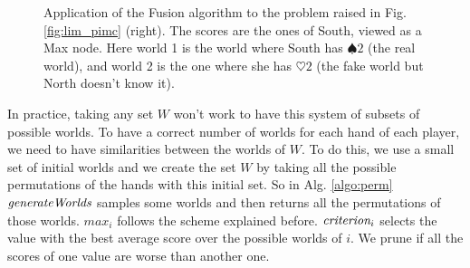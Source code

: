 \documentclass[runningheads]{llncs}
\begin{document}
\begin{figure}[t]
        \caption{Application of the Fusion algorithm to the problem raised in Fig. \ref{fig:lim_pimc} (right). The scores are the ones of South, viewed as a Max node. Here world 1 is the world where South has $\spadesuit 2$ (the real world), and world 2 is the one where she has $\heartsuit 2$ (the fake world but North doesn't know it).}
    \label{tree_perm}
        \hspace{-0.5cm}
\end{figure}


In practice, taking any set $W$ won't work to have this system of subsets of possible worlds. To have a correct number of worlds for each hand of each player, we need to have similarities between the worlds of $W$. To do this, we use a small set of initial worlds and we create the set $W$ by taking all the possible permutations of the hands with this initial set. So in Alg. \ref{algo:perm} $\mbox{\em generateWorlds}$ samples some worlds and then returns all the permutations of those worlds. $max_i$ follows the scheme explained before. $\mbox{\em criterion}_i$ selects the value with the best average score over the possible worlds of $i$. We prune if all the scores of one value are worse than another one.
\end{document}
